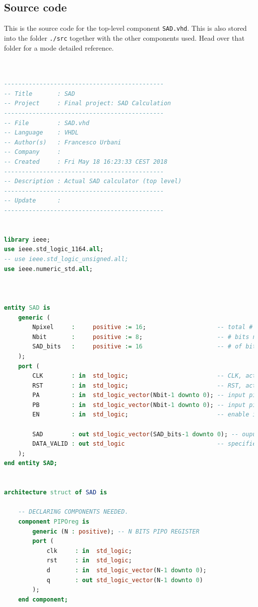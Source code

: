\documentclass[12pt, a4paper]{article}
\begin{document}
\begin{appendices}

\section{Source code}\label{appendix:code}

This is the source code for the top-level component \texttt{SAD.vhd}. This is also stored into the folder \texttt{./src} together with the other components used. Head over that folder for a mode detailed reference.


\begin{lstlisting}[language=vhdl]


---------------------------------------------
-- Title       : SAD
-- Project     : Final project: SAD Calculation
---------------------------------------------
-- File        : SAD.vhd
-- Language    : VHDL
-- Author(s)   : Francesco Urbani
-- Company     : 
-- Created     : Fri May 18 16:23:33 CEST 2018
---------------------------------------------
-- Description : Actual SAD calculator (top level)
---------------------------------------------
-- Update      :
---------------------------------------------


library ieee;
use ieee.std_logic_1164.all;
-- use ieee.std_logic_unsigned.all;
use ieee.numeric_std.all;



entity SAD is
	generic (
		Npixel     :     positive := 16;                    -- total # of pixels of the image
		Nbit       :     positive := 8;                     -- # bits needed to represent the value of each pixel
		SAD_bits   :     positive := 16                     -- # of bits needed to represent the output
	);
	port (
		CLK        : in  std_logic;	                        -- CLK, active on rising edge
		RST        : in  std_logic;	                        -- RST, active high
		PA         : in  std_logic_vector(Nbit-1 downto 0);	-- input pixel value image A
		PB         : in  std_logic_vector(Nbit-1 downto 0);	-- input pixel value image B
		EN         : in  std_logic;	                        -- enable input

		SAD        : out std_logic_vector(SAD_bits-1 downto 0);	-- ouput SAD value
		DATA_VALID : out std_logic	                        -- specifies whether the output SAD is valid or not
	);
end entity SAD;


architecture struct of SAD is
	
	-- DECLARING COMPONENTS NEEDED.
	component PIPOreg is
		generic (N : positive); -- N BITS PIPO REGISTER
		port (
			clk     : in  std_logic;
			rst     : in  std_logic;
			d       : in  std_logic_vector(N-1 downto 0);
			q       : out std_logic_vector(N-1 downto 0)
		);
	end component;


\end{lstlisting}
\end{appendices}
\end{document}
